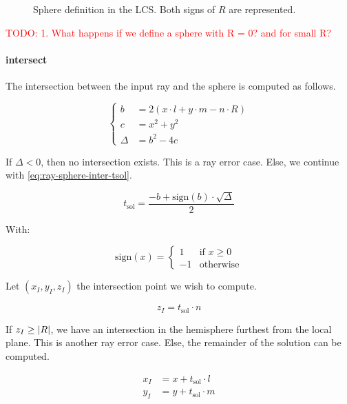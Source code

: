 \begin{figure} \caption{\label{fig:sphere-def-lcs} Sphere definition
in the LCS. Both signs of $R$ are represented.}

\end{figure}

\textcolor{red}{TODO:
1. What happens if we define a sphere with R = 0? and for small R?
}

\paragraph{intersect}
The intersection between the input ray and the sphere is computed as
follows.

\begin{equation} \label{eq:ray-sphere-inter1}
\begin{cases}
b &= 2 (x \cdot l + y \cdot m - n \cdot R) \\
c &= x^2 + y^2 \\
\Delta &= b^2 - 4 c
\end{cases}
\end{equation}

If $\Delta < 0$, then no intersection exists. This is a ray error case. Else,
we continue with \cref{eq:ray-sphere-inter-tsol}.

\begin{equation} \label{eq:ray-sphere-inter-tsol}
t_\textrm{sol} = \frac{-b + \textrm{sign}(b) \cdot \sqrt{\Delta}}{2}
\end{equation}

With:

\begin{equation}
\textrm{sign}(x) = \begin{cases}
1 & \text{if } x \geq 0 \\
-1 & \text{otherwise}
\end{cases}
\end{equation}

Let $(x_I, y_I, z_I)$ the intersection point we wish to compute.

\begin{equation}
z_I = t_\textrm{sol} \cdot n
\end{equation}

If $z_I \geq \abs{R}$, we have an intersection in the hemisphere furthest from
the local plane. This is another ray error case. Else, the remainder of the
solution can be computed.

\begin{equation}
\begin{aligned}
x_I &= x + t_\textrm{sol} \cdot l \\
y_I &= y + t_\textrm{sol} \cdot m
\end{aligned}
\end{equation}

